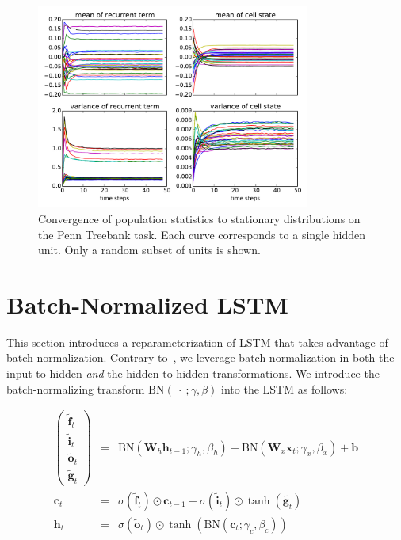 \documentclass{article} %
\newcommand{\vect}[1]{\mathbf{#1}}
\newcommand{\mat}[1]{\mathbf{#1}}
\newcommand{\ewprod}{\odot}
\begin{document}
\begin{figure}[!ht]
\center
\includegraphics[width=0.8\textwidth]{figures/popstat_stationarity.pdf}
\caption{Convergence of population statistics to stationary distributions on the 
Penn Treebank task. Each curve corresponds to a single hidden unit. Only a random subset of units is shown.}
\label{fig:popstat_stationarity}
\end{figure}



\section{Batch-Normalized LSTM}
\label{sec:recurrent-batch-normalization}

This section introduces a reparameterization of LSTM that takes advantage of
batch normalization. Contrary to~\citet{cesar, baidu}, we leverage batch
normalization in both the input-to-hidden \emph{and} the hidden-to-hidden
transformations.  We introduce the batch-normalizing transform $\mathrm{BN}(\
\cdot\ ; \gamma, \beta)$ into the LSTM as follows:

\begin{eqnarray}
\left(\begin{array}{ccc}
\tilde{\vect{f}}_t \\
\tilde{\vect{i}}_t \\
\tilde{\vect{o}}_t \\
\tilde{\vect{g}}_t
\end{array}\right)
 &=&
 \mathrm{BN} (\mat{W}_h \vect{h}_{t-1}; \gamma_h, \beta_h) +
 \mathrm{BN} (\mat{W}_x \vect{x}_t   ; \gamma_x, \beta_x) +
 \vect{b}
\\
\vect{c}_t &=& \sigma(\tilde{\vect{f}}_t) \ewprod \vect{c}_{t-1} +
               \sigma(\tilde{\vect{i}}_t) \ewprod \tanh(\tilde{\vect{g}_t}) \\
\vect{h}_t &=& \sigma(\tilde{\vect{o}}_t) \ewprod \tanh(
 \mathrm{BN} (\vect{c}_t; \gamma_c, \beta_c)
)
\end{eqnarray}
\end{document}
